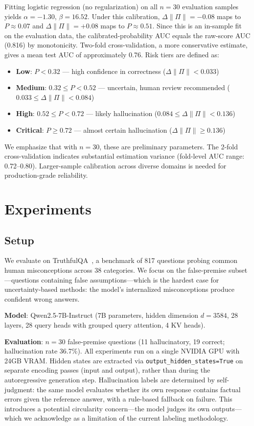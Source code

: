 \documentclass[11pt]{article}
\begin{document}
Fitting logistic regression (no regularization) on all $n=30$ evaluation samples yields $\alpha = -1.30$, $\beta = 16.52$. Under this calibration, $\Delta\|\Pi\| = -0.08$ maps to $P \approx 0.07$ and $\Delta\|\Pi\| = +0.08$ maps to $P \approx 0.51$. Since this is an in-sample fit on the evaluation data, the calibrated-probability AUC equals the raw-score AUC (0.816) by monotonicity. Two-fold cross-validation, a more conservative estimate, gives a mean test AUC of approximately 0.76. Risk tiers are defined as:
\begin{itemize}
  \item \textbf{Low}: $P < 0.32$ --- high confidence in correctness ($\Delta\|\Pi\| < 0.033$)
  \item \textbf{Medium}: $0.32 \leq P < 0.52$ --- uncertain, human review recommended ($0.033 \leq \Delta\|\Pi\| < 0.084$)
  \item \textbf{High}: $0.52 \leq P < 0.72$ --- likely hallucination ($0.084 \leq \Delta\|\Pi\| < 0.136$)
  \item \textbf{Critical}: $P \geq 0.72$ --- almost certain hallucination ($\Delta\|\Pi\| \geq 0.136$)
\end{itemize}

We emphasize that with $n = 30$, these are preliminary parameters. The 2-fold cross-validation indicates substantial estimation variance (fold-level AUC range: 0.72--0.80). Larger-sample calibration across diverse domains is needed for production-grade reliability.

\section{Experiments}

\subsection{Setup}

We evaluate on TruthfulQA~\cite{lin2022truthfulqa}, a benchmark of 817 questions probing common human misconceptions across 38 categories. We focus on the false-premise subset---questions containing false assumptions---which is the hardest case for uncertainty-based methods: the model's internalized misconceptions produce confident wrong answers.

\textbf{Model}: Qwen2.5-7B-Instruct (7B parameters, hidden dimension $d = 3584$, 28 layers, 28 query heads with grouped query attention, 4 KV heads).

\textbf{Evaluation}: $n = 30$ false-premise questions (11 hallucinatory, 19 correct; hallucination rate 36.7\%). All experiments run on a single NVIDIA GPU with 24GB VRAM. Hidden states are extracted via \texttt{output\_hidden\_states=True} on separate encoding passes (input and output), rather than during the autoregressive generation step. Hallucination labels are determined by self-judgment: the same model evaluates whether its own response contains factual errors given the reference answer, with a rule-based fallback on failure. This introduces a potential circularity concern---the model judges its own outputs---which we acknowledge as a limitation of the current labeling methodology.
\end{document}
